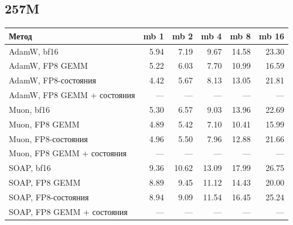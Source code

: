 \documentclass[10pt]{article}
\begin{document}
\subsection{257M}
\begin{center}
\small
\begin{tabular}{lrrrrr}
\toprule
\textbf{Метод} & \textbf{mb 1} & \textbf{mb 2} & \textbf{mb 4} & \textbf{mb 8} & \textbf{mb 16} \\
\midrule
AdamW, bf16 & 5.94 & 7.19 & 9.67 & 14.58 & 23.30 \\
AdamW, FP8 GEMM & 5.22 & 6.03 & 7.70 & 10.99 & 16.59 \\
AdamW, FP8-состояния & 4.42 & 5.67 & 8.13 & 13.05 & 21.81 \\
AdamW, FP8 GEMM + состояния & --- & --- & --- & --- & --- \\
Muon, bf16 & 5.30 & 6.57 & 9.03 & 13.96 & 22.69 \\
Muon, FP8 GEMM & 4.89 & 5.42 & 7.10 & 10.41 & 15.99 \\
Muon, FP8-состояния & 4.96 & 5.50 & 7.96 & 12.88 & 21.66 \\
Muon, FP8 GEMM + состояния & --- & --- & --- & --- & --- \\
SOAP, bf16 & 9.36 & 10.62 & 13.09 & 17.99 & 26.75 \\
SOAP, FP8 GEMM & 8.89 & 9.45 & 11.12 & 14.43 & 20.00 \\
SOAP, FP8-состояния & 8.94 & 9.09 & 11.54 & 16.45 & 25.24 \\
SOAP, FP8 GEMM + состояния & --- & --- & --- & --- & --- \\
\bottomrule
\end{tabular}
\end{center}
\end{document}
